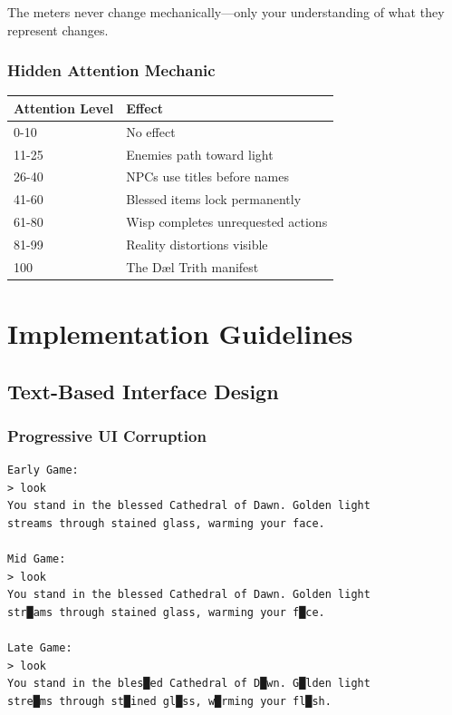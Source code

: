 \documentclass[11pt,a4paper,twoside]{book}
\begin{document}
The meters never change mechanically—only your understanding of what they represent changes.

\subsection{Hidden Attention Mechanic}

\begin{tcolorbox}[codexbox={Attention Thresholds}]
\begin{tabular}{ll}
\textbf{Attention Level} & \textbf{Effect} \\
\hline
0-10 & No effect \\
11-25 & Enemies path toward light \\
26-40 & NPCs use titles before names \\
41-60 & Blessed items lock permanently \\
61-80 & Wisp completes unrequested actions \\
81-99 & Reality distortions visible \\
100 & The Dæl Trith manifest \\
\end{tabular}
\end{tcolorbox}

\chapter{Implementation Guidelines}

\section{Text-Based Interface Design}

\subsection{Progressive UI Corruption}

\begin{verbatim}
Early Game:
> look
You stand in the blessed Cathedral of Dawn. Golden light 
streams through stained glass, warming your face.

Mid Game:
> look
You stand in the blessed Cathedral of Dawn. Golden light 
str█ams through stained glass, warming your f█ce.

Late Game:
> look
You stand in the bles█ed Cathedral of D█wn. G█lden light 
stre█ms through st█ined gl█ss, w█rming your fl█sh.
\end{verbatim}
\end{document}
